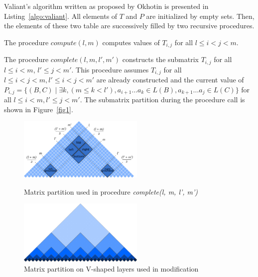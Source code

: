 Valiant's algorithm written as proposed by Okhotin is presented in Listing~\ref{algo:valiant}.
All elements of $T$ and $P$ are initialized by empty sets.
Then, the elements of these two table are successively filled by two recursive procedures.



The procedure $compute(l, m)$ computes values of $T_{i,j}$ for all $l \le i < j < m$.

The procedure $complete(l, m, l', m')$ constructs the submatrix $T_{i, j}$ for all $l \le i < m$, $l' \le j < m'$. This procedure assumes $T_{i, j}$ for all $l \leq i < j < m,  l' \leq i < j < m'$ are already constructed and the current value of  $P_{i, j} =  \{ (B, C) \mid \exists k, (m \le k < l'), a_{i + 1} \dots a_{k} \in L(B), a_{k + 1} \dots a_{j} \in L(C)\}$ for all $l \leq i < m,  l' \leq j < m'$.
The submatrix partition during the procedure call is shown in Figure~\ref{fig1}.


\begin{figure}
\vspace{3mm}
 \begin{center}
    \begin{minipage}{0.48\textwidth}
        \centering
        \includegraphics[width=6cm]{pictures/splitting_with_grounded.pdf}
        \caption{Matrix partition used in procedure \textit{complete(l, m, l', m')}}
        \label{fig1}
    \end{minipage}\hfill
    \begin{minipage}{0.48\textwidth}
        \centering
        \includegraphics[width=6cm]{pictures/layers.pdf}
        \caption{Matrix partition on V-shaped layers used in modification}
        \label{fig2}
    \end{minipage}
 \end{center}
\vspace{-8mm}
\end{figure}

